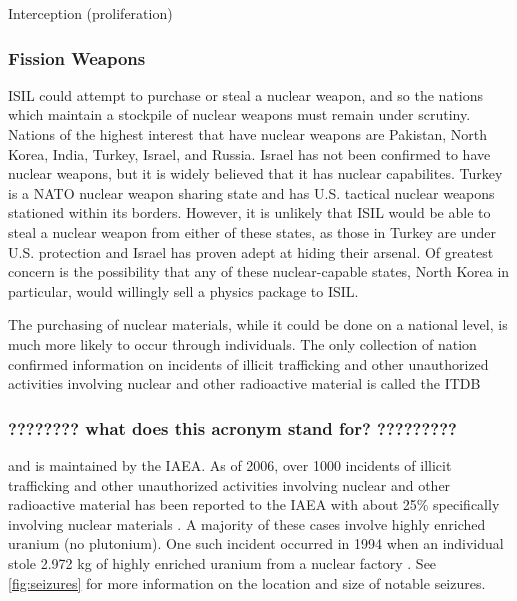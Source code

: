 \documentclass{report}
\begin{document}
Interception (proliferation)
 
\subsubsection{Fission Weapons}

ISIL could attempt to purchase or steal a nuclear weapon, and so the nations which maintain a stockpile of nuclear weapons must remain under scrutiny. Nations of the highest interest that have nuclear weapons are Pakistan, North Korea, India, Turkey, Israel, and Russia. Israel has not been confirmed to have nuclear weapons, but it is widely believed that it has nuclear capabilites. Turkey is a NATO nuclear weapon sharing state and has U.S. tactical nuclear weapons stationed within its borders. However, it is unlikely that ISIL would be able to steal a nuclear weapon from either of these states, as those in Turkey are under U.S. protection and Israel has proven adept at hiding their arsenal. Of greatest concern is the possibility that any of these nuclear-capable states, North Korea in particular, would willingly sell a physics package to ISIL.

The purchasing of nuclear materials, while it could be done on a national level, is much more likely to occur through individuals. The only collection of nation confirmed information on incidents of illicit trafficking and other unauthorized activities involving nuclear and other radioactive material is called the ITDB \subsubsection{???????? what does this acronym stand for?  ?????????} and is maintained by the IAEA. As of 2006, over 1000 incidents of illicit trafficking and other unauthorized activities involving nuclear and other radioactive material has been reported to the IAEA with about 25\% specifically involving nuclear materials \cite{Iaea2007}. A majority of these cases involve highly enriched uranium (no plutonium). One such incident occurred in 1994 when an individual stole 2.972 kg of highly enriched uranium from a nuclear factory \cite{Iaea2007}. See \autoref{fig:seizures} for more information on the location and size of notable seizures. 
\end{document}

